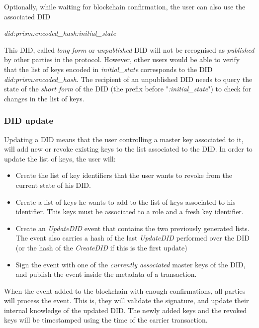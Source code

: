 \documentclass[10pt,a4paper]{article}
\begin{document}
Optionally, while waiting for blockchain confirmation, the user can also use the associated DID 

\begin{center}
\emph{did:prism:encoded\_hash:initial\_state}
\end{center}
	
This DID, called \emph{long form} or \emph{unpublished} DID will not be recognised as \emph{published} by other parties in the protocol. However, other users would be able to verify that the list of keys encoded in \emph{initial\_state} corresponds to the DID \emph{did:prism:encoded\_hash}. The recipient of an unpublished DID needs to query the state of the \emph{short form} of the DID (the prefix before "\emph{:initial\_state}") to check for changes in the list of keys. 

\subsubsection{DID update}

Updating a DID means that the user controlling a master key associated to it, will add new or revoke existing keys to the list associated to the DID. In order to update the list of keys, the user will:
\begin{itemize}
\item Create the list of key identifiers that the user wants to revoke from the current state of his DID.
\item Create a list of keys he wants to add to the list of keys associated to his identifier. 
      This keys must be associated to a role and a fresh key identifier.
\item Create an \emph{UpdateDID} event that contains the two previously generated lists.
      The event also carries a hash of the last \emph{UpdateDID} performed over the DID (or the hash of the \emph{CreateDID} if this is the first 
      update)
\item Sign the event with one of the \emph{currently associated} master keys of the DID, and publish the event inside the metadata of a transaction.
\end{itemize}

When the event added to the blockchain with enough confirmations, all parties will process the event. This is, they will validate the signature, and update their internal knowledge of the updated DID. The newly added keys and the revoked keys will be timestamped using the time of the carrier transaction.
\end{document}
